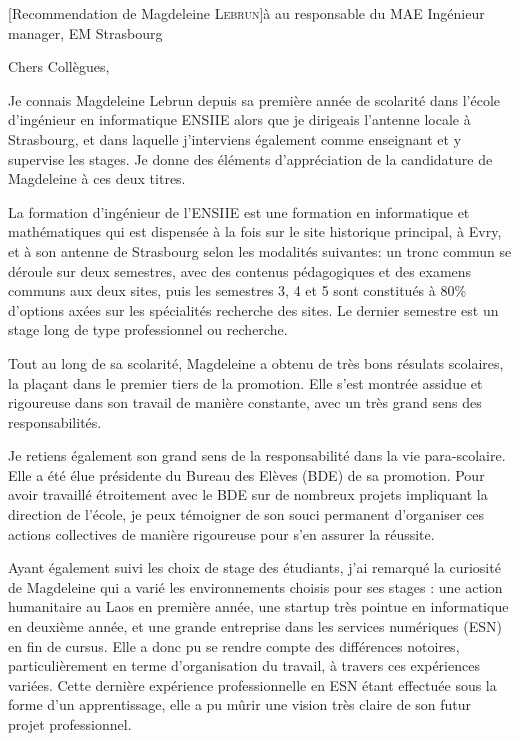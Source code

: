 \documentclass[a4paper,10pt]{article}
\begin{document}

\begin{letter}[Recommendation de Magdeleine \textsc{Lebrun}]{à}%
{au responsable du MAE Ingénieur manager, EM Strasbourg}

Chers Collègues,

Je connais Magdeleine Lebrun depuis sa  première année de scolarité dans l'école
d'ingénieur en  informatique ENSIIE  alors que je  dirigeais l'antenne  locale à
Strasbourg,  et  dans laquelle  j'interviens  également  comme enseignant  et  y
supervise les stages.  Je donne des éléments d'appréciation de la candidature de
Magdeleine à ces deux titres.


La formation d'ingénieur de l'ENSIIE est une formation en informatique et
mathématiques qui est dispensée à la fois sur le site
historique principal, à Evry, et à son antenne de Strasbourg selon les modalités
suivantes: un tronc commun se déroule sur deux semestres, avec des contenus 
pédagogiques et des examens communs aux deux sites, puis les semestres 3, 4 et 5
sont constitués à 80\% d'options axées sur les spécialités recherche des sites.
Le dernier semestre est un stage long de type professionnel ou recherche. 

Tout  au  long de  sa  scolarité,  Magdeleine a  obtenu  de  très bons  résulats
scolaires, la plaçant dans le premier tiers de la promotion. Elle s'est montrée
assidue et rigoureuse dans son travail de manière constante, avec un très grand
sens des responsabilités. 
 

Je  retiens  également  son  grand  sens   de  la  responsabilité  dans  la  vie
para-scolaire.  Elle  a été  élue présidente  du Bureau des  Elèves (BDE)  de sa
promotion.  Pour avoir travaillé étroitement avec le BDE sur de nombreux projets
impliquant la  direction de l'école,  je peux  témoigner de son  souci permanent
d'organiser ces actions  collectives de manière rigoureuse pour  s'en assurer la
réussite.

Ayant  également suivi  les  choix  de stage  des  étudiants,  j'ai remarqué  la
curiosité de Magdeleine qui a varié les environnements choisis pour ses stages :
une action  humanitaire au Laos en  première année, une startup  très pointue en
informatique  en deuxième  année, et  une  grande entreprise  dans les  services
numériques (ESN) en fin de cursus. Elle a donc pu se rendre compte des différences
notoires, particulièrement en terme d'organisation du travail, à travers ces
expériences variées. Cette dernière expérience professionnelle en ESN étant
effectuée sous la forme d'un apprentissage, elle a pu mûrir une vision très
claire de son futur projet professionnel.



\end{letter}
\end{document}
